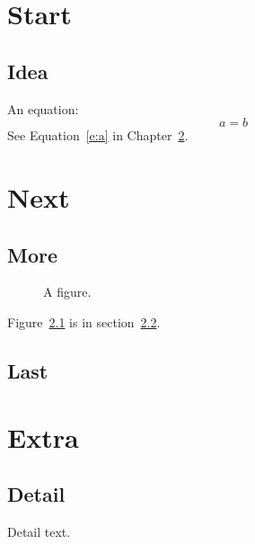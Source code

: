 \documentclass{report}
\begin{document}
\chapter{Start}
\section{Idea}
An equation:
\begin{equation}\label{e:a}
a = b
\end{equation}
See Equation~\eqref{e:a} in Chapter~\ref{c:two}.
\chapter{Next}\label{c:two}
\section{More}
\begin{figure}
\caption{A figure.}\label{f:x}
\end{figure}
Figure~\ref{f:x} is in section~\ref{s:m}.
\section{Last}\label{s:m}
\appendix
\chapter{Extra}
\section{Detail}
Detail text.
\end{document}

